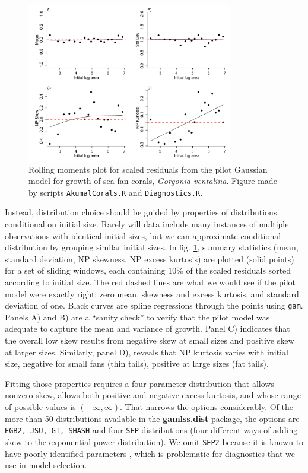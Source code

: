 \documentclass[11pt]{article}
\begin{document}
{\begin{figure}[tbp]
\centering
\includegraphics[width=0.8\textwidth]{figures/AkumalRollingResiduals.pdf}
\caption{Rolling moments plot for scaled residuals from the pilot Gaussian model for growth of sea fan corals, \emph{Gorgonia ventalina}. 
Figure made by scripts \texttt{AkumalCorals.R} and \texttt{Diagnostics.R}.}
\label{fig:AkumalRollingResiduals}
\end{figure} 

Instead, distribution choice should be guided by properties of distributions conditional on initial size. 
Rarely will data include many instances of multiple observations with identical initial sizes, but we can 
approximate conditional distribution by grouping similar initial sizes. 
In fig. \ref{fig:AkumalRollingResiduals}, summary statistics (mean, standard deviation, NP skewness, NP excess kurtosis) 
are plotted (solid points) for a set of sliding windows, each containing 10\% of the scaled residuals sorted according to initial size. 
The red dashed lines are what we would see if the pilot model were exactly right: zero mean, skewness and excess kurtosis, and standard deviation of one. 
Black curves are spline regressions through the points using \texttt{gam}. Panels A) and B) are a ``sanity check'' to verify
that the pilot model was adequate to capture the mean and variance of growth. Panel C) indicates that the overall low skew results from negative
skew at small sizes and positive skew at larger sizes. Similarly, panel D), reveals that NP kurtosis varies with initial size, 
negative for small fans (thin tails), positive at large sizes (fat tails). 

Fitting those properties requires a four-parameter distribution that allows nonzero skew, allows both 
positive and negative excess kurtosis, and whose range of possible values is $(-\infty, \infty)$. That narrows the options considerably. 
Of the more than 50 distributions available in the \textbf{gamlss.dist} package, the options are 
\texttt{EGB2, JSU, GT, SHASH} and four \texttt{SEP} distributions (four different ways of adding skew to the
exponential power distribution). We omit \texttt{SEP2} because it is known to have poorly identified parameters
\citep{diciccio-monti-2004}, which is problematic for diagnostics that we use in model selection. 

}
\end{document}
